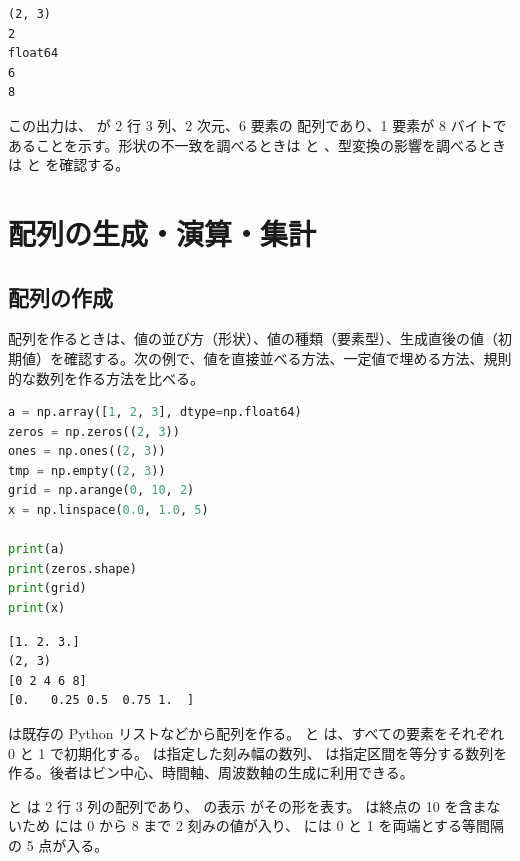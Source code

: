 \begin{lstlisting}[numbers=none, xleftmargin=2\zw]
(2, 3)
2
float64
6
8
\end{lstlisting}

この出力は、 が 2 行 3 列、2 次元、6 要素の  配列であり、1 要素が 8 バイトであることを示す。形状の不一致を調べるときは  と 、型変換の影響を調べるときは  と  を確認する。

\section{配列の生成・演算・集計}

\subsection{配列の作成}

配列を作るときは、値の並び方（形状）、値の種類（要素型）、生成直後の値（初期値）を確認する。次の例で、値を直接並べる方法、一定値で埋める方法、規則的な数列を作る方法を比べる。

\begin{lstlisting}[language=Python]
a = np.array([1, 2, 3], dtype=np.float64)
zeros = np.zeros((2, 3))
ones = np.ones((2, 3))
tmp = np.empty((2, 3))
grid = np.arange(0, 10, 2)
x = np.linspace(0.0, 1.0, 5)

print(a)
print(zeros.shape)
print(grid)
print(x)
\end{lstlisting}

\begin{lstlisting}[numbers=none, xleftmargin=2\zw]
[1. 2. 3.]
(2, 3)
[0 2 4 6 8]
[0.   0.25 0.5  0.75 1.  ]
\end{lstlisting}

 は既存の Python リストなどから配列を作る。 と  は、すべての要素をそれぞれ 0 と 1 で初期化する。 は指定した刻み幅の数列、 は指定区間を等分する数列を作る。後者はビン中心、時間軸、周波数軸の生成に利用できる。

 と  は 2 行 3 列の配列であり、 の表示  がその形を表す。 は終点の 10 を含まないため  には 0 から 8 まで 2 刻みの値が入り、 には 0 と 1 を両端とする等間隔の 5 点が入る。

